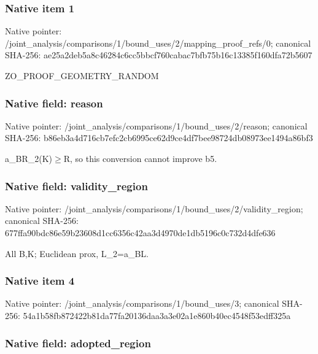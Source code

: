 \documentclass[10pt,a4paper]{article}
\begin{document}
\subsubsection{Native item 1}


Native pointer: /joint\_analysis/comparis\allowbreak{}ons/1/bound\_uses/2/mappi\allowbreak{}ng\_proof\_refs/0; canonical SHA-256: ae25a2deb5a8c46284c6cc5b\allowbreak{}bcf760cabac7bfb75b16c133\allowbreak{}85f160dfa72b5607


ZO\_PROOF\_GEOMETRY\_RANDOM


\subsubsection{Native field: reason}


Native pointer: /joint\_analysis/comparis\allowbreak{}ons/1/bound\_uses/2/reaso\allowbreak{}n; canonical SHA-256: b86eb3a4d716cb7efc2cb699\allowbreak{}5ce62d9ce4df7bee98724db0\allowbreak{}8973ee1494a86bf3


a\_BR\_2(K)\ensuremath{\ge}R, so this conversion cannot improve b5.


\subsubsection{Native field: validity\_region}


Native pointer: /joint\_analysis/comparis\allowbreak{}ons/1/bound\_uses/2/valid\allowbreak{}ity\_region; canonical SHA-256: 677ffa90bdc86e59b23608d1\allowbreak{}cc6356c42aa3d4970de1db51\allowbreak{}96c0c732d4dfe636


All B,K; Euclidean prox, L\_2=a\_BL.


\subsubsection{Native item 4}


Native pointer: /joint\_analysis/comparis\allowbreak{}ons/1/bound\_uses/3; canonical SHA-256: 54a1b58fb872422b81da77fa\allowbreak{}20136daa3a3e02a1e860b40e\allowbreak{}c4548f53edff325a



\subsubsection{Native field: adopted\_region}
\end{document}
